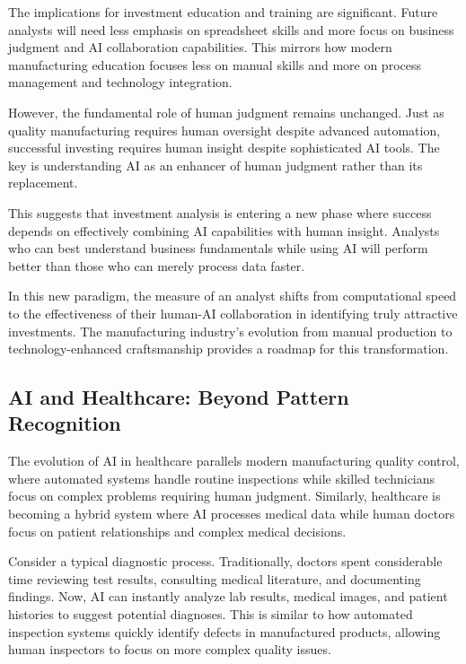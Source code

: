 \documentclass[
  Letterpaper,
]{scrbook}
\begin{document}
The implications for investment education and training are significant.
Future analysts will need less emphasis on spreadsheet skills and more
focus on business judgment and AI collaboration capabilities. This
mirrors how modern manufacturing education focuses less on manual skills
and more on process management and technology integration.

However, the fundamental role of human judgment remains unchanged. Just
as quality manufacturing requires human oversight despite advanced
automation, successful investing requires human insight despite
sophisticated AI tools. The key is understanding AI as an enhancer of
human judgment rather than its replacement.

This suggests that investment analysis is entering a new phase where
success depends on effectively combining AI capabilities with human
insight. Analysts who can best understand business fundamentals while
using AI will perform better than those who can merely process data
faster.

In this new paradigm, the measure of an analyst shifts from
computational speed to the effectiveness of their human-AI collaboration
in identifying truly attractive investments. The manufacturing
industry's evolution from manual production to technology-enhanced
craftsmanship provides a roadmap for this transformation.

\subsection{\texorpdfstring{AI and Healthcare: Beyond
Pattern
Recognition}{AI and Healthcare: Beyond Pattern Recognition}}\label{ai-and-healthcare-beyond-pattern-recognition}

The evolution of AI in healthcare parallels modern manufacturing quality
control, where automated systems handle routine inspections while
skilled technicians focus on complex problems requiring human judgment.
Similarly, healthcare is becoming a hybrid system where AI processes
medical data while human doctors focus on patient relationships and
complex medical decisions.

Consider a typical diagnostic process. Traditionally, doctors spent
considerable time reviewing test results, consulting medical literature,
and documenting findings. Now, AI can instantly analyze lab results,
medical images, and patient histories to suggest potential diagnoses.
This is similar to how automated inspection systems quickly identify
defects in manufactured products, allowing human inspectors to focus on
more complex quality issues.
\end{document}

